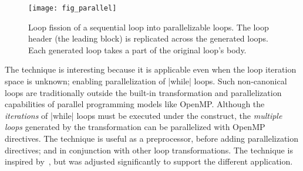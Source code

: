 \begin{figure}[h]
{\centering\texttt{[image: fig\_parallel]}}
\caption[Loop fission transformation]
{Loop fission of a sequential loop into parallelizable loops.
The loop header (the leading  block) is replicated across the generated loops.
Each generated loop takes a part of the original loop's body.}\label{fig:icc-fission}
\end{figure}

The technique is interesting because it is applicable even when the loop iteration space is unknown;
enabling parallelization of \eg \pr|while| loops.
Such non-canonical loops are traditionally outside the built-in transformation and parallelization capabilities of parallel programming models like OpenMP\@.
Although the \emph{iterations} of \pr|while| loops must be executed under the  construct,
the \emph{multiple loops} generated by the transformation can be parallelized with OpenMP directives.
The technique is useful as a preprocessor, before adding parallelization directives;
and in conjunction with other loop transformations.
The technique is inspired by~\cite{moyen20172}, but was adjusted significantly to support the different application.
